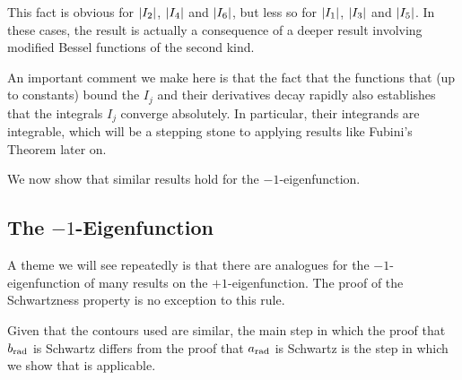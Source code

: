 This fact is obvious for $\left\lvert I_2 \right\rvert$, $\left\lvert I_4 \right\rvert$ and $\left\lvert I_6 \right\rvert$, but less so for $\left\lvert I_1 \right\rvert$, $\left\lvert I_3 \right\rvert$ and $\left\lvert I_5 \right\rvert$. In these cases, the result is actually a consequence of a deeper result involving modified Bessel functions of the second kind.


An important comment we make here is that the fact that the functions that (up to constants) bound the $I_j$ and their derivatives decay rapidly also establishes that the integrals $I_j$ converge absolutely. In particular, their integrands are integrable, which will be a stepping stone to applying results like Fubini's Theorem later on.

We now show that similar results hold for the $-1$-eigenfunction.

\subsection{The $-1$-Eigenfunction}

A theme we will see repeatedly is that there are analogues for the $-1$-eigenfunction of many results on the $+1$-eigenfunction. The proof of the Schwartzness property is no exception to this rule.

Given that the contours used are similar, the main step in which the proof that $b_{\operatorname{rad}}$ is Schwartz differs from the proof that $a_{\operatorname{rad}}$ is Schwartz is the step in which we show that  is applicable.